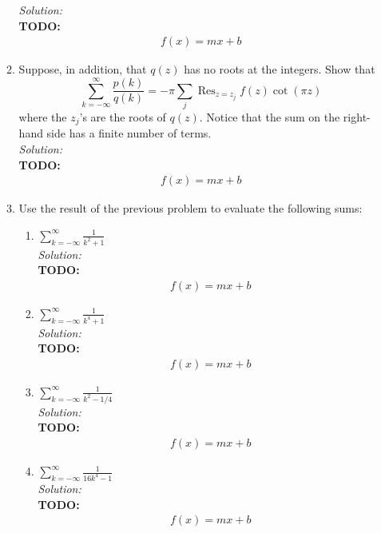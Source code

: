 \documentclass[10pt]{amsart}
\theoremstyle{nonumberplain}
\begin{document}
\begin{enumerate}[label={\bf {\arabic*}:}]
\begin{enumerate}
\noindent
\textit{Solution:} \\
\textbf{TODO:}
\begin{align*}
f(x) = mx + b
\end{align*}


\item Suppose, in addition, that $q(z)$ has no roots at the integers. Show that
$$
\sum_{k=-\infty}^{\infty} \frac{p(k)}{q(k)}=-\pi \sum_j \operatorname{Res}_{z=z_j} f(z) \cot (\pi z)
$$
where the $z_j$'s are the roots of $q(z)$. Notice that the sum on the
right-hand side has a finite number of terms. \\
 
\noindent
\textit{Solution:} \\
\textbf{TODO:}
\begin{align*}
f(x) = mx + b
\end{align*}

\newpage

\item Use the result of the previous problem to evaluate the following sums:
\begin{enumerate}
\item  $\displaystyle \sum_{k=-\infty}^{\infty} \frac{1}{k^2+1}$ \\
 
\noindent
\textit{Solution:} \\
\textbf{TODO:}
\begin{align*}
f(x) = mx + b
\end{align*}

\item  $\displaystyle \sum_{k=-\infty}^{\infty} \frac{1}{k^4+1}$ \\
 
\noindent
\textit{Solution:} \\
\textbf{TODO:}
\begin{align*}
f(x) = mx + b
\end{align*}


\item  $\displaystyle \sum_{k=-\infty}^{\infty} \frac{1}{k^2-1/4}$ \\
 
\noindent
\textit{Solution:} \\
\textbf{TODO:}
\begin{align*}
f(x) = mx + b
\end{align*}


\item  $\displaystyle \sum_{k=-\infty}^{\infty} \frac{1}{16k^4 -1}$ \\
 
\noindent
\textit{Solution:} \\
\textbf{TODO:}
\begin{align*}
f(x) = mx + b
\end{align*}


\end{enumerate}
\end{enumerate}

\end{enumerate}
  
\end{document}
